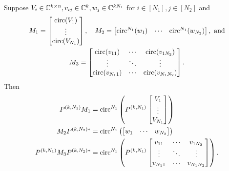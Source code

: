 \begin{lemma}
  Suppose $V_i \in \mathbb{C}^{k \times n}, v_{ij} \in \mathbb{C}^k, w_j \in \mathbb{C}^{k N_1}$ for $i \in [N_1], j \in [N_2]$ and
  \begin{gather*}
    M_1 = \begin{bmatrix} \operatorname{circ}(V_1) \\ \vdots \\ \operatorname{circ}(V_{N_1}) \end{bmatrix},\quad
    M_2 = \begin{bmatrix} \operatorname{circ}^{N_1}(w_1) & \cdots & \operatorname{circ}^{N_1}(w_{N_2}) \end{bmatrix},\ \text{and} \\
    M_3 = \begin{bmatrix} \operatorname{circ}(v_{11}) & \cdots & \operatorname{circ}(v_{1 N_2}) \\ \vdots & \ddots & \vdots \\ \operatorname{circ}(v_{N_1 1}) & \cdots & \operatorname{circ}(v_{N_1 N_2}) \end{bmatrix}.\end{gather*}
  Then
  \begin{align}
    P^{(k, N_1)} M_1 &= \operatorname{circ}^{N_1}\left(P^{(k, N_1)} \begin{bmatrix} V_1 \\ \vdots \\ V_{N_1} \end{bmatrix}\right) \label{eq:M_1} \\
    M_2 P^{(k, N_2)*} &= \operatorname{circ}^{N_1}\left(\begin{bmatrix} w_1 & \cdots & w_{N_2} \end{bmatrix}\right) \label{eq:M_2} \\
    P^{(k, N_1)}M_3P^{(k, N_2)*} &= \operatorname{circ}^{N_1}\left(P^{(k, N_1)} \begin{bmatrix} v_{11} & \cdots & v_{1 N_2} \\ \vdots & \ddots & \vdots \\ v_{N_1 1} & \cdots & v_{N_1 N_2} \end{bmatrix}\right). \label{eq:M_3}
  \end{align}
  \label{lem:interleave}
\end{lemma}

